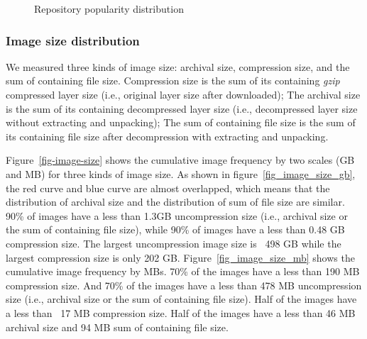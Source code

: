 \begin{figure}[!t]
	\centering
	\caption{Repository popularity distribution}
	\label{fig-pop}
\end{figure}

\subsubsection{Image size distribution}
\label{sec:image-size}
We measured three kinds of image size: archival size, compression size, and the sum of containing file size. Compression size is the sum of its containing \textit{gzip} compressed layer size (i.e., original layer size after downloaded); The archival size is the sum of its containing decompressed layer size (i.e., decompressed layer size without extracting and unpacking); The sum of containing file size is the sum of its containing file size after decompression with extracting and unpacking.

Figure~\ref{fig-image-size} shows the cumulative image frequency by two scales (GB and MB) for three kinds of image size.
As shown in figure~\ref{fig_image_size_gb}, the red curve and blue curve are almost overlapped, which means that the distribution of archival size and the distribution of sum of file size are similar. 90\% of images have a less than 1.3GB uncompression size (i.e., archival size or the sum of containing file size), while 90\% of images have a less than 0.48 GB compression size. The largest uncompression image size is ~498 GB while the largest compression size is only 202 GB.
Figure~\ref{fig_image_size_mb} shows the cumulative image frequency by MBs. 70\% of the images have a less than 190 MB compression size. And 70\% of the images have a less than 478 MB uncompression size (i.e., archival size or the sum of containing file size). Half of the images have a less than ~17 MB compression size. Half of the images have a less than 46 MB archival size and 94 MB sum of containing file size.

